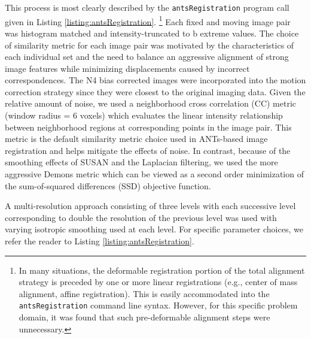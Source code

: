 \documentclass{llncs}
\begin{document}
This process is most clearly described by the {\tt antsRegistration} program call given in Listing 
\ref{listing:antsRegistration}.%
\footnote{
In many situations, the deformable registration portion of the total alignment strategy
is preceded by one or more linear registrations (e.g., center of mass alignment, affine 
registration).  This is easily accommodated into the {\tt antsRegistration} command line
syntax.  However, for this specific problem domain, it was found that such pre-deformable
alignment steps were unnecessary.
}  
Each fixed and moving image pair was histogram
matched \cite{nyul2000} and intensity-truncated to b extreme values.  The
choice of similarity metric for each image pair was motivated by the characteristics
of each individual set and the need to balance an aggressive alignment of strong image features 
while minimizing displacements caused by incorrect correspondences.  The N4 bias corrected
images were incorporated into the motion correction strategy since they were closest
to the original imaging data. Given the relative amount of noise, we used a neighborhood
cross correlation (CC) metric (window radius = 6 voxels) which evaluates the linear
intensity relationship between neighborhood regions at corresponding points in the image 
pair.  This metric
is the default similarity metric choice used in ANTs-based image registration \cite{avants2008}
and helps mitigate the effects of noise.  In
contrast, because of the smoothing effects of SUSAN and the Laplacian filtering, 
we used the more aggressive Demons metric \cite{thirion1998} 
which can be viewed as a second order minimization of the sum-of-squared differences
(SSD) objective function.  

A multi-resolution approach
consisting of three levels with each successive level corresponding to double the resolution
of the previous level was used with varying isotropic smoothing used at each level.  For
specific parameter choices, we refer the reader to Listing 
\ref{listing:antsRegistration}.
\end{document}
